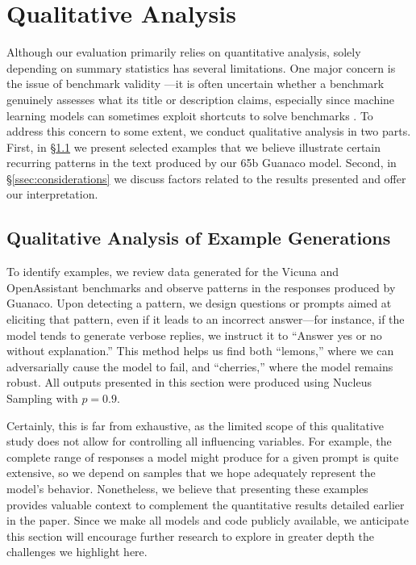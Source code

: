 \section{Qualitative Analysis}

Although our evaluation primarily relies on quantitative analysis, solely depending on summary statistics has several limitations. One major concern is the issue of benchmark validity \citep{liao2021we}—it is often uncertain whether a benchmark genuinely assesses what its title or description claims, especially since machine learning models can sometimes exploit shortcuts to solve benchmarks \citep{gururangan2018annotation, poliak2018hypothesis}. To address this concern to some extent, we conduct qualitative analysis in two parts. First, in \S\ref{ssec:examples} we present selected examples that we believe illustrate certain recurring patterns in the text produced by our 65b {Guanaco} model. Second, in \S\ref{ssec:considerations} we discuss factors related to the results presented and offer our interpretation.

\subsection{Qualitative Analysis of Example Generations}
\label{ssec:examples}

To identify examples, we review data generated for the Vicuna and OpenAssistant benchmarks and observe patterns in the responses produced by {Guanaco}. Upon detecting a pattern, we design questions or prompts aimed at eliciting that pattern, even if it leads to an incorrect answer—for instance, if the model tends to generate verbose replies, we instruct it to ``Answer yes or no without explanation.'' This method helps us find both ``lemons,'' where we can adversarially cause the model to fail, and ``cherries,'' where the model remains robust. All outputs presented in this section were produced using Nucleus Sampling \cite{holtzmancurious} with $p=0.9$.

Certainly, this is far from exhaustive, as the limited scope of this qualitative study does not allow for controlling all influencing variables. For example, the complete range of responses a model might produce for a given prompt is quite extensive, so we depend on samples that we hope adequately represent the model's behavior. Nonetheless, we believe that presenting these examples provides valuable context to complement the quantitative results detailed earlier in the paper. Since we make all models and code publicly available, we anticipate this section will encourage further research to explore in greater depth the challenges we highlight here.

